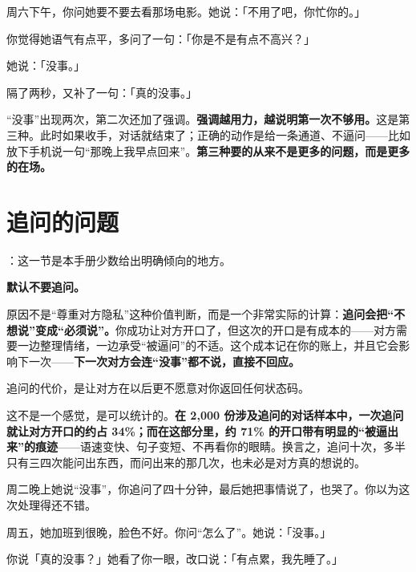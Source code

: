 \par
\begin{mdquote}
周六下午，你问她要不要去看那场电影。她说：「不用了吧，你忙你的。」\par
\vspace{0.3\baselineskip}
你觉得她语气有点平，多问了一句：「你是不是有点不高兴？」\par
\vspace{0.3\baselineskip}
她说：「没事。」\par
\vspace{0.3\baselineskip}
隔了两秒，又补了一句：「真的没事。」\par
\end{mdquote}

“没事”出现两次，第二次还加了强调。\textbf{强调越用力，越说明第一次不够用。}这是第三种。此时如果收手，对话就结束了；正确的动作是给一条通道、不逼问——比如放下手机说一句“那晚上我早点回来”。\textbf{第三种要的从来不是更多的问题，而是更多的在场。}

\section{追问的问题}

：这一节是本手册少数给出明确倾向的地方。

\textbf{默认不要追问。}

原因不是“尊重对方隐私”这种价值判断，而是一个非常实际的计算：\textbf{追问会把“不想说”变成“必须说”。}你成功让对方开口了，但这次的开口是有成本的——对方需要一边整理情绪，一边承受“被逼问”的不适。这个成本记在你的账上，并且它会影响下一次——\textbf{下一次对方会连“没事”都不说，直接不回应。}

追问的代价，是让对方在以后更不愿意对你返回任何状态码。

这不是一个感觉，是可以统计的。\textbf{在 2,000 份涉及追问的对话样本中，一次追问就让对方开口的约占 34\%；而在这部分里，约 71\% 的开口带有明显的“被逼出来”的痕迹}——语速变快、句子变短、不再看你的眼睛。换言之，追问十次，多半只有三四次能问出东西，而问出来的那几次，也未必是对方真的想说的。

\par
\begin{mdquote}
周二晚上她说“没事”，你追问了四十分钟，最后她把事情说了，也哭了。你以为这次处理得还不错。\par
\vspace{0.3\baselineskip}
周五，她加班到很晚，脸色不好。你问“怎么了”。她说：「没事。」\par
\vspace{0.3\baselineskip}
你说「真的没事？」她看了你一眼，改口说：「有点累，我先睡了。」\par
\end{mdquote}

